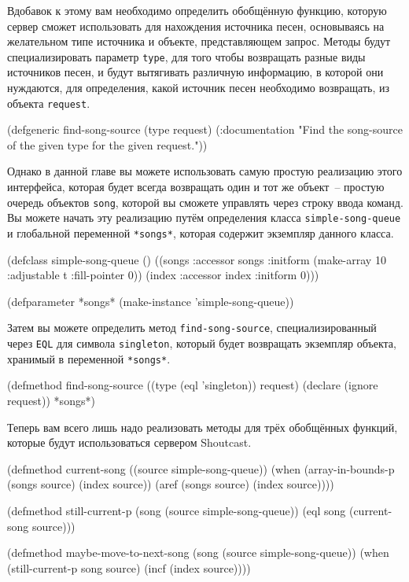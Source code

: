 Вдобавок к этому вам необходимо определить обобщённую функцию, которую сервер сможет
использовать для нахождения источника песен, основываясь на желательном типе источника и
объекте, представляющем запрос.  Методы будут специализировать параметр \lstinline{type}, для
того чтобы возвращать разные виды источников песен, и будут вытягивать различную
информацию, в которой они нуждаются, для определения, какой источник песен необходимо
возвращать, из объекта \lstinline{request}.

\begin{myverb}
(defgeneric find-song-source (type request)
  (:documentation "Find the song-source of the given type for the given request."))
\end{myverb}

Однако в данной главе вы можете использовать самую простую реализацию этого интерфейса,
которая будет всегда возвращать один и тот же объект~-- простую очередь объектов
\lstinline{song}, которой вы сможете управлять через строку ввода команд. Вы можете начать эту
реализацию путём определения класса \lstinline{simple-song-queue} и глобальной переменной
\lstinline{*songs*}, которая содержит экземпляр данного класса.

\begin{myverb}
(defclass simple-song-queue ()
  ((songs :accessor songs :initform (make-array 10 :adjustable t :fill-pointer 0))
   (index :accessor index :initform 0)))

(defparameter *songs* (make-instance 'simple-song-queue))
\end{myverb}

Затем вы можете определить метод \lstinline{find-song-source}, специализированный через
\lstinline{EQL} для символа \lstinline{singleton}, который будет возвращать экземпляр объекта,
хранимый в переменной \lstinline{*songs*}.

\begin{myverb}
(defmethod find-song-source ((type (eql 'singleton)) request)
  (declare (ignore request))
  *songs*)
\end{myverb}

Теперь вам всего лишь надо реализовать методы для трёх обобщённых функций, которые будут
использоваться сервером Shoutcast.

\begin{myverb}
(defmethod current-song ((source simple-song-queue))
  (when (array-in-bounds-p (songs source) (index source))
    (aref (songs source) (index source))))

(defmethod still-current-p (song (source simple-song-queue))
  (eql song (current-song source)))

(defmethod maybe-move-to-next-song (song (source simple-song-queue))
  (when (still-current-p song source)
    (incf (index source))))
\end{myverb}

